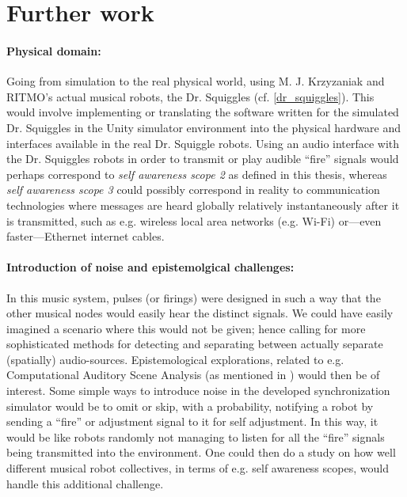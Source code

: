 \section{Further work}

	\paragraph{Physical domain:}
	Going from simulation to the real physical world, using M. J. Krzyzaniak and RITMO's  actual musical robots, the Dr. Squiggles (cf. \ref{dr_squiggles}). This would involve implementing or translating the software written for the simulated Dr. Squiggles in the Unity simulator environment into the physical hardware and interfaces available in the real Dr. Squiggle robots. Using an audio interface with the Dr. Squiggles robots in order to transmit or play audible ``fire'' signals would perhaps correspond to \textit{self awareness scope 2} as defined in this thesis, whereas \textit{self awareness scope 3} could possibly correspond in reality to communication technologies where messages are heard globally relatively instantaneously after it is transmitted, such as e.g. wireless local area networks (e.g. Wi-Fi) or—even faster—Ethernet internet cables.

	\paragraph{Introduction of noise and epistemolgical challenges:}
	In this music system, pulses (or firings) were designed in such a way that the other musical nodes would easily hear the distinct signals. We could have easily imagined a scenario where this would not be given; hence calling for more sophisticated methods for detecting and separating between actually separate (spatially) audio-sources. Epistemological explorations, related to e.g. Computational Auditory Scene Analysis (as mentioned in \cite{casa}) would then be of interest. Some simple ways to introduce noise in the developed synchronization simulator would be to omit or skip, with a probability, notifying a robot by sending a ``fire'' or adjustment signal to it for self adjustment. In this way, it would be like robots randomly not managing to listen for all the ``fire'' signals being transmitted into the environment. One could then do a study on how well different musical robot collectives, in terms of e.g. self awareness scopes, would handle this additional challenge.
	
	

